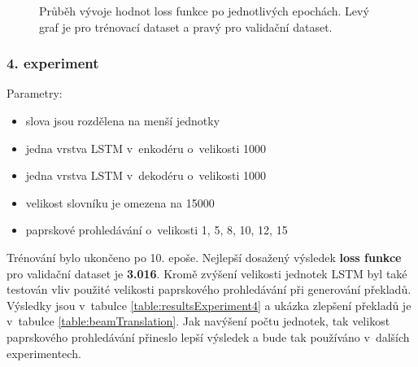 \begin{figure}[H]
    \begin{center}
    \end{center}
	\caption{Průběh vývoje hodnot loss funkce po jednotlivých epochách. Levý graf je pro trénovací dataset a pravý pro validační dataset.}
\end{figure}

\subsubsection{4. experiment}\label{experiment4}
Parametry:
\begin{itemize}
  \item slova jsou rozdělena na menší jednotky
  \item jedna vrstva LSTM v~enkodéru o~velikosti 1000
  \item jedna vrstva LSTM v~dekodéru o~velikosti 1000
  \item velikost slovníku je omezena na 15000
  \item paprskové prohledávání o~velikosti 1, 5, 8, 10, 12, 15
\end{itemize}

Trénování bylo ukončeno po 10. epoše. Nejlepší dosažený výsledek \textbf{loss funkce} pro validační dataset je \textbf{3.016}. Kromě zvýšení velikosti jednotek LSTM byl také testován vliv použité velikosti paprskového prohledávání při generování překladů. Výsledky jsou v~tabulce \ref{table:resultsExperiment4} a ukázka zlepšení překladů je v~tabulce \ref{table:beamTranslation}. Jak navýšení počtu jednotek, tak velikost paprskového prohledávání přineslo lepší výsledek a bude tak používáno v~dalších experimentech.

